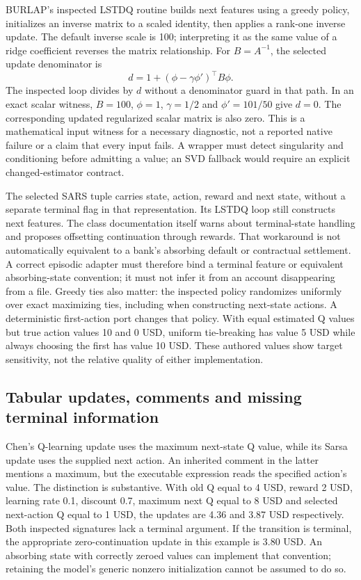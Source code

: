 BURLAP's inspected LSTDQ routine builds next features using a greedy policy, initializes an inverse matrix to a scaled identity, then applies a rank-one inverse update. The default inverse scale is 100; interpreting it as the same value of a ridge coefficient reverses the matrix relationship. For $B=A^{-1}$, the selected update denominator is
\[
 d=1+(\phi-\gamma\phi')^\top B\phi.
\]
The inspected loop divides by $d$ without a denominator guard in that path. In an exact scalar witness, $B=100$, $\phi=1$, $\gamma=1/2$ and $\phi'=101/50$ give $d=0$. The corresponding updated regularized scalar matrix is also zero. This is a mathematical input witness for a necessary diagnostic, not a reported native failure or a claim that every input fails. A wrapper must detect singularity and conditioning before admitting a value; an SVD fallback would require an explicit changed-estimator contract.~\citep{exec24_policyjava_burlap,exec24_policyjava_comparison}

The selected SARS tuple carries state, action, reward and next state, without a separate terminal flag in that representation. Its LSTDQ loop still constructs next features. The class documentation itself warns about terminal-state handling and proposes offsetting continuation through rewards. That workaround is not automatically equivalent to a bank's absorbing default or contractual settlement. A correct episodic adapter must therefore bind a terminal feature or equivalent absorbing-state convention; it must not infer it from an account disappearing from a file. Greedy ties also matter: the inspected policy randomizes uniformly over exact maximizing ties, including when constructing next-state actions. A deterministic first-action port changes that policy. With equal estimated Q values but true action values 10 and 0 USD, uniform tie-breaking has value 5 USD while always choosing the first has value 10 USD. These authored values show target sensitivity, not the relative quality of either implementation.~\citep{exec24_policyjava_burlap,exec24_policyjava_comparison}

\subsection{Tabular updates, comments and missing terminal information}
Chen's Q-learning update uses the maximum next-state Q value, while its Sarsa update uses the supplied next action. An inherited comment in the latter mentions a maximum, but the executable expression reads the specified action's value. The distinction is substantive. With old Q equal to 4 USD, reward 2 USD, learning rate 0.1, discount 0.7, maximum next Q equal to 8 USD and selected next-action Q equal to 1 USD, the updates are 4.36 and 3.87 USD respectively. Both inspected signatures lack a terminal argument. If the transition is terminal, the appropriate zero-continuation update in this example is 3.80 USD. An absorbing state with correctly zeroed values can implement that convention; retaining the model's generic nonzero initialization cannot be assumed to do so.~\citep{exec24_policyjava_chen,exec24_policyjava_comparison}

